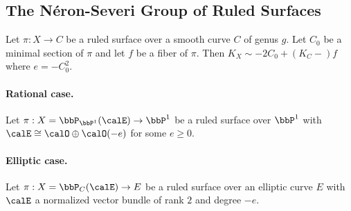 \subsection{The N\'eron-Severi Group of Ruled Surfaces}

    \begin{proposition}\label{prop:canonical_divisor_of_ruled_surface}
        Let \(\pi:X \to C\) be a ruled surface over a smooth curve \(C\) of genus \(g\). 
        Let \(C_0\) be a minimal section of \(\pi\) and let \(f\) be a fiber of \(\pi\). 
        Then \(K_X \sim -2C_0 + (K_C-)f\) where \(e = -C_0^2\).
    \end{proposition}

    \paragraph{Rational case.} Let \(\pi:X = \bbP_{\bbP^1}(\calE) \to \bbP^1\) be a ruled surface over \(\bbP^1\) with \(\calE \cong \calO \oplus \calO(-e)\) for some \(e \geq 0\).

    \paragraph{Elliptic case.} Let \(\pi:X = \bbP_C(\calE) \to E\) be a ruled surface over an elliptic curve \(E\) with \(\calE\) a normalized vector bundle of rank \(2\) and degree \(-e\).

        

